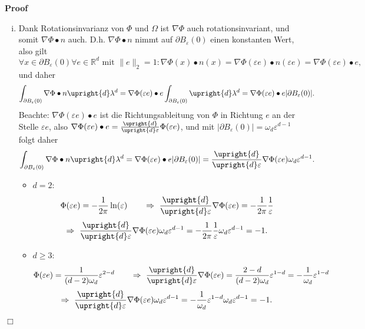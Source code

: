 \documentclass{book}
\newenvironment{enumerateroman}{\begin{enumerate}[i.] }{\end{enumerate}}
\newenvironment{itemizedot}{\begin{itemize} \renewcommand{\labelitemi}{$\bullet$}\renewcommand{\labelitemii}{$\bullet$}\renewcommand{\labelitemiii}{$\bullet$}\renewcommand{\labelitemiv}{$\bullet$}}{\end{itemize}}
\newenvironment{proof}{\noindent\textbf{Proof\ }}{\hspace*{\fill}$\Box$\medskip}
\begin{document}
\begin{proof}
\begin{enumerateroman}
    \item Dank Rotationsinvarianz von $\Phi$ und $\Omega$ ist $\nabla \Phi$
    auch rotationsinvariant, und somit $\nabla \Phi \bullet n$ auch. D.h.
    $\nabla \Phi \bullet n$ nimmt auf $\partial B_{\varepsilon} (0)$ einen
    konstanten Wert, also gilt
    \[ \forall x \in \partial B_{\varepsilon} (0) \forall e \in \mathbb{R}^d 
       \text{ mit } \| e \|_2 = 1 : \nabla \Phi (x) \bullet n (x) = \nabla
       \Phi (\varepsilon e) \bullet n (\varepsilon e) = \nabla \Phi
       (\varepsilon e) \bullet e, \]
    und daher
    \[ \int_{\partial B_{\varepsilon} (0)} \nabla \Phi \bullet n \upright{d}
       \lambda^d = \nabla \Phi (\varepsilon e) \bullet e \int_{\partial
       B_{\varepsilon} (0)}  \upright{d} \lambda^d = \nabla \Phi (\varepsilon
       e) \bullet e | \partial B_{\varepsilon} (0) | . \]
    Beachte: $\nabla \Phi (\varepsilon e) \bullet e$ ist die
    Richtungsableitung von $\Phi$ in Richtung $e$ an der Stelle $\varepsilon
    e$, also $\nabla \Phi (\varepsilon e) \bullet e =
    \frac{\upright{d}}{\upright{d} \varepsilon} \Phi (\varepsilon e)$, und mit
    $| \partial B_{\varepsilon} (0) | = \omega_d \varepsilon^{d - 1}$ folgt
    daher
    \[ \int_{\partial B_{\varepsilon} (0)} \nabla \Phi \bullet n \upright{d}
       \lambda^d = \nabla \Phi (\varepsilon e) \bullet e | \partial
       B_{\varepsilon} (0) | = \frac{\upright{d}}{\upright{d} \varepsilon}
       \nabla \Phi (\varepsilon e) \omega_d \varepsilon^{d - 1} . \]
    \begin{itemizedot}
      \item $d = 2$:
      \[ \Phi (\varepsilon e) = - \frac{1}{2 \pi} \ln (\varepsilon)
         \text{\qquad} \Rightarrow \text{ } \frac{\upright{d}}{\upright{d}
         \varepsilon} \nabla \Phi (\varepsilon e) = - \frac{1}{2 \pi}
         \frac{1}{\varepsilon} \]
      \[ \Rightarrow \text{ } \frac{\upright{d}}{\upright{d} \varepsilon}
         \nabla \Phi (\varepsilon e) \omega_d \varepsilon^{d - 1} = -
         \frac{1}{2 \pi} \frac{1}{\varepsilon} \omega_d \varepsilon^{d - 1} =
         - 1. \]
      \item $d \geq 3$:
      \[ \Phi (\varepsilon e) = \frac{1}{(d - 2) \omega_d} \varepsilon^{2 - d}
         \text{\qquad} \Rightarrow \text{ } \frac{\upright{d}}{\upright{d}
         \varepsilon} \nabla \Phi (\varepsilon e) = \frac{2 - d}{(d - 2)
         \omega_d} \varepsilon^{1 - d} = - \frac{1}{\omega_d} \varepsilon^{1 -
         d} \]
      \[ \Rightarrow \text{ } \frac{\upright{d}}{\upright{d} \varepsilon}
         \nabla \Phi (\varepsilon e) \omega_d \varepsilon^{d - 1} = -
         \frac{1}{\omega_d} \varepsilon^{1 - d} \omega_d \varepsilon^{d - 1} =
         - 1. \]
    \end{itemizedot}
  \end{enumerateroman}
\end{proof}
\end{document}
